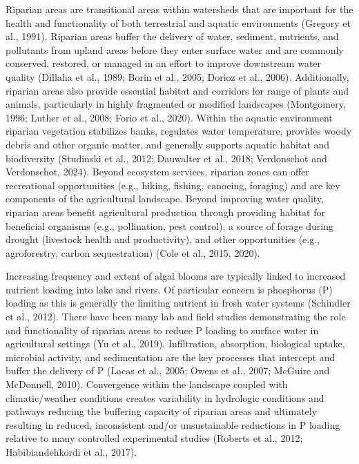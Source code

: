 \documentclass[
]{agujournal2019}
\begin{document}
Riparian areas are transitional areas within watersheds that are
important for the health and functionality of both terrestrial and
aquatic environments (Gregory et al., 1991). Riparian areas buffer the
delivery of water, sediment, nutrients, and pollutants from upland areas
before they enter surface water and are commonly conserved, restored, or
managed in an effort to improve downstream water quality (Dillaha et
al., 1989; Borin et al., 2005; Dorioz et al., 2006). Additionally,
riparian areas also provide essential habitat and corridors for range of
plants and animals, particularly in highly fragmented or modified
landscapes (Montgomery, 1996; Luther et al., 2008; Forio et al., 2020).
Within the aquatic environment riparian vegetation stabilizes banks,
regulates water temperature, provides woody debris and other organic
matter, and generally supports aquatic habitat and biodiversity
(Studinski et al., 2012; Dauwalter et al., 2018; Verdonschot and
Verdonschot, 2024). Beyond ecosystem services, riparian zones can offer
recreational opportunities (e.g., hiking, fishing, canoeing, foraging)
and are key components of the agricultural landscape. Beyond improving
water quality, riparian areas benefit agricultural production through
providing habitat for beneficial organisms (e.g., pollination, pest
control), a source of forage during drought (livestock health and
productivity), and other opportunities (e.g., agroforestry, carbon
sequestration) (Cole et al., 2015, 2020).

Increasing frequency and extent of algal blooms are typically linked to
increased nutrient loading into lake and rivers. Of particular concern
is phosphorus (P) loading as this is generally the limiting nutrient in
fresh water systems (Schindler et al., 2012). There have been many lab
and field studies demonstrating the role and functionality of riparian
areas to reduce P loading to surface water in agricultural settings (Yu
et al., 2019). Infiltration, absorption, biological uptake, microbial
activity, and sedimentation are the key processes that intercept and
buffer the delivery of P (Lacas et al., 2005; Owens et al., 2007;
McGuire and McDonnell, 2010). Convergence within the landscape coupled
with climatic/weather conditions creates variability in hydrologic
conditions and pathways reducing the buffering capacity of riparian
areas and ultimately resulting in reduced, inconsistent and/or
unsustainable reductions in P loading relative to many controlled
experimental studies (Roberts et al., 2012; Habibiandehkordi et al.,
2017).
\end{document}
